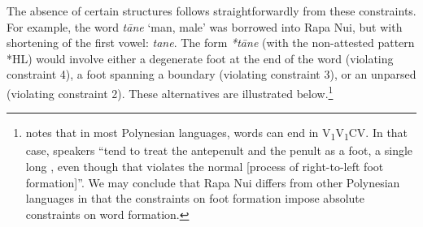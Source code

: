 
The absence of certain structures follows straightforwardly from these constraints. For example, the  word \textit{tāne} ‘man, male’ was borrowed into Rapa Nui, but with shortening of the first vowel: \textit{tane}. The form \textit{*tāne} (with the non-attested pattern *HL) would involve either a degenerate foot at the end of the word (violating constraint 4), a foot spanning a  boundary (violating constraint 3), or an unparsed  (violating constraint 2). These alternatives are illustrated below.\footnote{\label{fn:48}\citet[171]{Finney1999} notes that in most Polynesian languages, words can end in V\textsubscript{1}V\textsubscript{1}CV. In that case, speakers “tend to treat the antepenult and the penult as a foot, a single long , even though that violates the normal [process of right-to-left foot formation]”. We may conclude that Rapa Nui differs from other Polynesian languages in that the constraints on foot formation impose absolute constraints on word formation.} 

